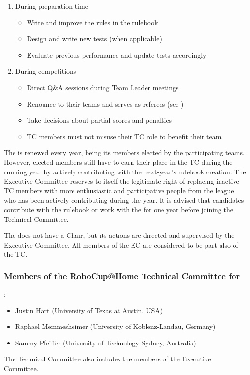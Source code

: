 \begin{enumerate}
  \item During preparation time
  \begin{itemize}
    \item Write and improve the rules in the rulebook
    \item Design and write new tests (when applicable)
    \item Evaluate previous performance and update tests accordingly
  \end{itemize}
  \item During competitions
  \begin{itemize}
    \item Direct Q\&A sessions during Team Leader meetings
    \item Renounce to their teams and serves as referees (see )
    \item Take decisions about partial scores and penalties
    \item TC members must not misuse their TC role to benefit their team.
  \end{itemize}
\end{enumerate}

The  is renewed every year, being its members elected by the participating teams. However, elected members still have to earn their place in the TC during the running year by actively contributing with the next-year's rulebook creation.
The Executive Committee reserves to itself the legitimate right of replacing inactive TC members with more enthusiastic and participative people from the league who has been actively contributing during the year.
It is advised that candidates contribute with the rulebook or work with the  for one year before joining the Technical Committee.

The  does not have a Chair, but its actions are directed and supervised by the Executive Committee. All members of the EC are considered to be part also of the TC.

\subsubsection{Members of the RoboCup@Home Technical Committee for \YEAR}:
\begin{itemize}
  \item Justin Hart (University of Texas at Austin, USA)
  \item Raphael Memmesheimer (University of Koblenz-Landau, Germany)
  \item Sammy Pfeiffer (University of Technology Sydney, Australia)
\end{itemize}
The Technical Committee also includes the members of the Executive Committee.


